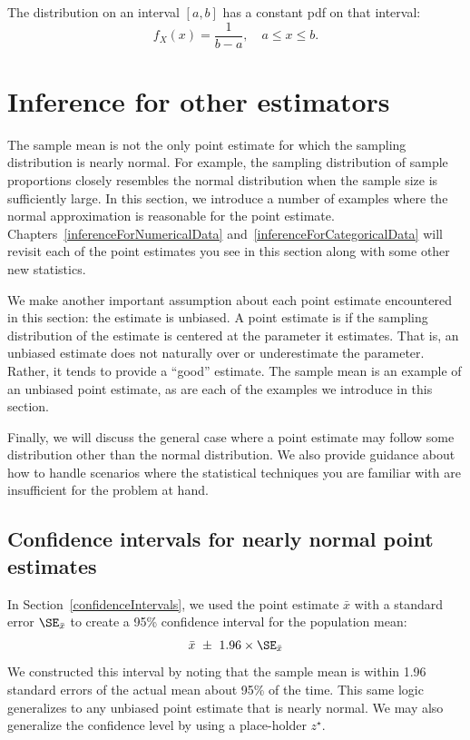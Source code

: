 The  distribution on an interval $[a,b]$ has a constant pdf on that interval:
\[
	f_X(x)=\frac1{b-a},\quad a\le x\le b.
\]



\section{Inference for other estimators}
\label{aFrameworkForInference}

The sample mean is not the only point estimate for which the sampling distribution is nearly normal. For example, the sampling distribution of sample proportions closely resembles the normal distribution when the sample size is sufficiently large. In this section, we introduce a number of examples where the normal approximation is reasonable for the point estimate. Chapters~\ref{inferenceForNumericalData} and~\ref{inferenceForCategoricalData} will revisit each of the point estimates you see in this section along with some other new statistics.

We make another important assumption about each point estimate encountered in this section: the estimate is unbiased. A point estimate is  if the sampling distribution of the estimate is centered at the parameter it estimates. That is, an unbiased estimate does not naturally over or underestimate the parameter. Rather, it tends to provide a ``good'' estimate. The sample mean is an example of an unbiased point estimate, as are each of the examples we introduce in this section.

Finally, we will discuss the general case where a point estimate may follow some distribution other than the normal distribution. We also provide guidance about how to handle scenarios where the statistical techniques you are familiar with are insufficient for the problem at hand.


\subsection{Confidence intervals for nearly normal point estimates}


In Section~\ref{confidenceIntervals}, we used the point estimate $\bar{x}$ with a standard error $\SE_{\bar{x}}$ to create a 95\% confidence interval for the population mean:
\begin{align}
\bar{x}\ \pm\ 1.96 \times \SE_{\bar{x}}
\label{95PercCIForMeanInGeneralizingSection}
\end{align}
We constructed this interval by noting that the sample mean is within 1.96 standard errors of the actual mean about 95\% of the time. This same logic generalizes to any unbiased point estimate that is nearly normal. We may also generalize the confidence level by using a place-holder $z^{\star}$.

